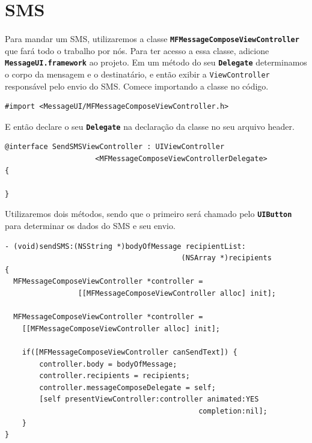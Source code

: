 \documentclass[a4paper,12pt,brazil,doubleside]{book}
\begin{document}
\bigskip


\section{SMS}

\paragraph{}Para mandar um SMS, utilizaremos a classe \texttt{\textbf{MFMessageComposeViewController}} que fará todo o trabalho por nós. Para ter acesso a essa classe, adicione \texttt{\textbf{MessageUI.framework}} ao projeto. Em um método do seu \texttt{\textbf{Delegate}} determinamos o corpo da mensagem e o destinatário, e então exibir a \texttt{ViewController} responsável pelo envio do SMS.
Comece importando a classe no código.

\begin{listing}
\begin{verbatim}
#import <MessageUI/MFMessageComposeViewController.h>
\end{verbatim}
\end{listing}

E então declare o seu \texttt{\textbf{Delegate}} na declaração da classe no seu arquivo header.

\begin{listing}
\begin{verbatim}
@interface SendSMSViewController : UIViewController
                     <MFMessageComposeViewControllerDelegate>
{
	
}
\end{verbatim}
\end{listing}

Utilizaremos dois métodos, sendo que o primeiro será chamado pelo \texttt{\textbf{UIButton}} para determinar os dados do SMS e seu envio.

\pagebreak

\begin{listing}
\begin{verbatim}
- (void)sendSMS:(NSString *)bodyOfMessage recipientList:
                                         (NSArray *)recipients
{
  MFMessageComposeViewController *controller =
                 [[MFMessageComposeViewController alloc] init];

  MFMessageComposeViewController *controller =
    [[MFMessageComposeViewController alloc] init];
    
    if([MFMessageComposeViewController canSendText]) {
        controller.body = bodyOfMessage;
        controller.recipients = recipients;
        controller.messageComposeDelegate = self;
        [self presentViewController:controller animated:YES
                                             completion:nil];
    }
}
\end{verbatim}
\end{listing}
\end{document}
